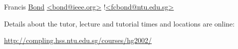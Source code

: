 \documentclass[headrule,footrule]{foils}
\begin{document}
\begin{description}\addtolength{\itemsep}{-5mm}
\item [Coordinator]  Francis \ul{Bond} 
{\small \url{<bond@ieee.org>} !\url{<fcbond@ntu.edu.sg>}}
\item Details about the tutor, lecture and tutorial times and
  locations are online:
  \begin{center}
    \url{http://compling.hss.ntu.edu.sg/courses/hg2002/}    
  \end{center}


\end{description}




\end{document}
